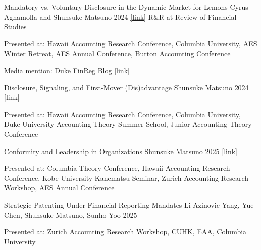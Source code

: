 \vspace{.5cm}

\paperentry
	{Mandatory vs. Voluntary Disclosure in the Dynamic Market for Lemons}   %
	{Cyrus Aghamolla and Shunsuke Matsuno}   %
	{2024}   %
	{\href{https://papers.ssrn.com/sol3/papers.cfm?abstract_id=4680389}{[link]}}  %
	{}   %
	{R\&R at Review of Financial Studies}   %
	{
	\begin{cvitems}  %
		\item {Presented at: Hawaii Accounting Research Conference\co, Columbia University, AES Winter Retreat\co, AES Annual Conference, Burton Accounting Conference\co} 
		\item {Media mention: Duke FinReg Blog \href{https://sites.duke.edu/thefinregblog/2024/10/29/mandatory-vs-voluntary-disclosure-in-the-dynamic-market-for-lemons/}{[link]}}
	\end{cvitems}
	}
	{}

\paperentry
	{Disclosure, Signaling, and First-Mover (Dis)advantage}   %
	{Shunsuke Matsuno}   %
	{2024}
	{\href{https://papers.ssrn.com/sol3/papers.cfm?abstract_id=4985567}{[link]}}  %
	{}   %
	{}   %
	{
	\begin{cvitems}  %
		\item {Presented at: Hawaii Accounting Research Conference, Columbia University, Duke University Accounting Theory Summer School, Junior Accounting Theory Conference}
	\end{cvitems}
	}
	{}

\paperentry
	{Conformity and Leadership in Organizations}
	{Shunsuke Matsuno}
	{2025}
	{\href{https://papers.ssrn.com/sol3/papers.cfm?abstract_id=5291646}[link]}
	{}
	{}
	{
	\begin{cvitems} %
		\item {Presented at: Columbia Theory Conference, Hawaii Accounting Research Conference, Kobe University Kanematsu Seminar, Zurich Accounting Research Workshop, AES Annual Conference}
	\end{cvitems}
	}
	{}

\paperentry
	{Strategic Patenting Under Financial Reporting Mandates}
	{Li Azinovic-Yang, Yue Chen, Shunsuke Matsuno, Sunho Yoo}
	{2025}
	{}
	{}
	{}
	{
	\begin{cvitems} %
		\item {Presented at: Zurich Accounting Research Workshop\co, CUHK\co, EAA\co, Columbia University\co}
	\end{cvitems}
	}
	{}


